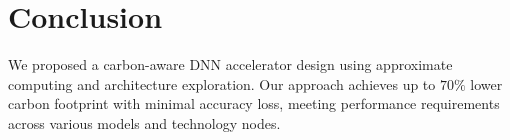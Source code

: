 
\vspace{-3pt}
\section{Conclusion}\label{sec:conclusion}
\vspace{-3pt}
We proposed a carbon-aware DNN accelerator design using approximate computing and architecture exploration. Our approach achieves up to $70\%$ lower carbon footprint with minimal accuracy loss, meeting performance requirements across various models and technology nodes.

